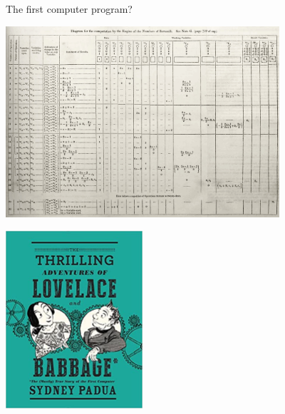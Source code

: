 \documentclass[xcolor={usenames,dvipsnames,svgnames,table},12pt]{beamer}
\begin{document}
\begin{frame}{The first computer program?}
  \begin{center}
    \includegraphics[width=4in]{lovelace-program}
  \end{center}
\end{frame}



\begin{frame}{}
  \begin{center}
    \includegraphics[width=2in]{adventures}
  \end{center}
\end{frame}
\end{document}
